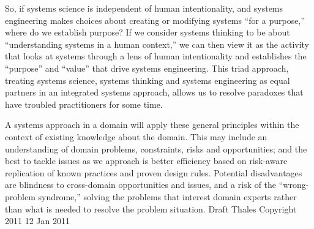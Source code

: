 So, if systems science is independent of human intentionality, and systems engineering makes choices about creating or modifying systems ``for a purpose,'' where do we establish purpose?  If we consider systems thinking to be about ``understanding systems in a human context,'' we can then view it as the activity that looks at systems through a lens of human intentionality and establishes the ``purpose'' and ``value'' that drive systems engineering. This triad approach, treating systems science, systems thinking and systems engineering as equal partners in an integrated systems approach, allows us to resolve paradoxes that have troubled practitioners for some time.

A systems approach in a domain will apply these general principles within the context of existing knowledge about the domain. This may include an understanding of domain problems, constraints, risks and opportunities; and the best to tackle issues as we approach is better efficiency based on risk-aware replication of known practices and proven design rules. Potential disadvantages are blindness to cross-domain opportunities and issues, and a risk of the ``wrong-problem syndrome,'' solving the problems that interest domain experts rather than what is needed to resolve the problem situation. Draft Thales Copyright 2011 12 Jan 2011

